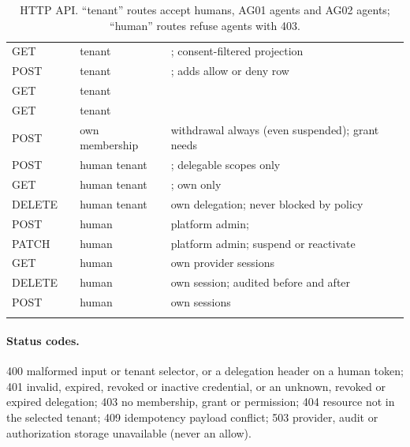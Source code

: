 \begin{longtable}{@{}P{1.6cm} P{5.4cm} P{2.3cm} P{4.4cm}@{}}
GET &  & tenant & ; consent-filtered projection\\
POST &  & tenant & ; adds allow or deny row\\
GET &  & tenant & \\
GET &  & tenant & \\
POST &  & own membership & withdrawal always (even suspended); grant needs \\
POST &  & human tenant & ; delegable scopes only\\
GET &  & human tenant & ; own only\\
DELETE &  & human tenant & own delegation; never blocked by policy\\
POST &  & human & platform admin; \\
PATCH &  & human & platform admin; suspend or reactivate\\
GET &  & human & own provider sessions\\
DELETE &  & human & own session; audited before and after\\
POST &  & human & own sessions\\
\bottomrule
\caption{HTTP API. ``tenant'' routes accept humans, AG01 agents and AG02 agents; ``human'' routes refuse agents with 403.}
\end{longtable}

\paragraph{Status codes.} 400 malformed input or tenant selector, or a delegation header on a human token; 401 invalid, expired, revoked or inactive credential, or an unknown, revoked or expired delegation; 403 no membership, grant or permission; 404 resource not in the selected tenant; 409 idempotency payload conflict; 503 provider, audit or authorization storage unavailable (never an allow).

